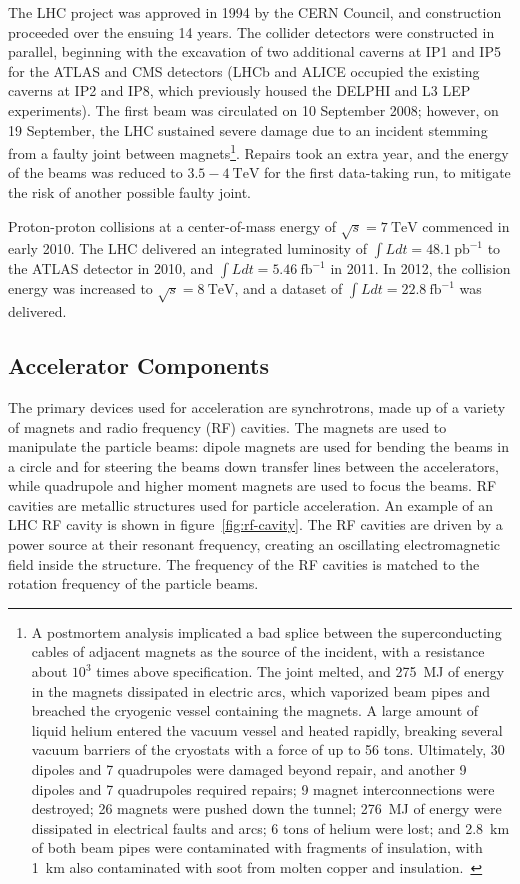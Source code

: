 The LHC project was approved in 1994 by the CERN Council, and construction proceeded over the ensuing 14 years. The collider detectors were constructed in parallel, beginning with the excavation of two additional caverns at IP1 and IP5 for the ATLAS and CMS detectors (LHCb and ALICE occupied the existing caverns at IP2 and IP8, which previously housed the DELPHI and L3 LEP experiments). The first beam was circulated on 10 September 2008; however, on 19 September, the LHC sustained severe damage due to an incident stemming from a faulty joint between magnets\footnote{A postmortem analysis implicated a bad splice between the superconducting cables of adjacent magnets as the source of the incident, with a resistance about $10^3$ times above specification. The joint melted, and 275~MJ of energy in the magnets dissipated in electric arcs, which vaporized beam pipes and breached the cryogenic vessel containing the magnets. A large amount of liquid helium entered the vacuum vessel and heated rapidly, breaking several vacuum barriers of the cryostats with a force of up to 56 tons. Ultimately, 30 dipoles and 7 quadrupoles were damaged beyond repair, and another 9 dipoles and 7 quadrupoles required repairs; 9 magnet interconnections were destroyed; 26 magnets were pushed down the tunnel; 276~MJ of energy were dissipated in electrical faults and arcs; 6 tons of helium were lost; and 2.8~km of both beam pipes were contaminated with fragments of insulation, with 1~km also contaminated with soot from molten copper and insulation.~\cite{Rossi:2010el}}. Repairs took an extra year, and the energy of the beams was reduced to $3.5-4~\mbox{TeV}$ for the first data-taking run, to mitigate the risk of another possible faulty joint. 

Proton-proton collisions at a center-of-mass energy of $\sqrt{s}=7~\mbox{TeV}$ commenced in early 2010. The LHC delivered an integrated luminosity of $\int L dt=48.1~\mbox{pb}^{-1}$ to the ATLAS detector in 2010, and $\int L dt=5.46~\mbox{fb}^{-1}$ in 2011. In 2012, the collision energy was increased to $\sqrt{s}=8~\mbox{TeV}$, and a dataset of $\int L dt=22.8~\mbox{fb}^{-1}$ was delivered. 

\subsection{Accelerator Components}
The primary devices used for acceleration are synchrotrons, made up of a variety of magnets and radio frequency (RF) cavities. The magnets are used to manipulate the particle beams: dipole magnets are used for bending the beams in a circle and for steering the beams down transfer lines between the accelerators, while quadrupole and higher moment magnets are used to focus the beams. RF cavities are metallic structures used for particle acceleration. An example of an LHC RF cavity is shown in figure~\ref{fig:rf-cavity}. The RF cavities are driven by a power source at their resonant frequency, creating an oscillating electromagnetic field inside the structure. The frequency of the RF cavities is matched to the rotation frequency of the particle beams.

